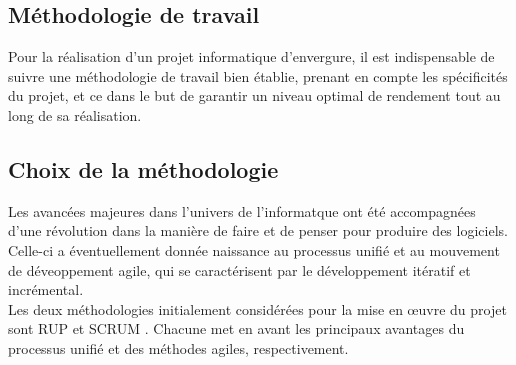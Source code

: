 \begin{spacing}{1.5}
\section{Méthodologie de travail}
Pour la réalisation d'un projet informatique d'envergure, il est indispensable de suivre une méthodologie de travail bien établie, prenant en compte les spécificités du projet, et ce dans le but de garantir un niveau optimal de rendement tout au long de sa réalisation.

\subsection{Choix de la méthodologie}
Les avancées majeures dans l'univers de l'informatque ont été accompagnées d'une révolution dans la manière de faire et de penser pour produire des logiciels. Celle-ci a éventuellement donnée naissance au processus unifié et au mouvement de déveoppement agile, qui se caractérisent par le développement itératif et incrémental.\\
Les deux méthodologies initialement considérées pour la mise en œuvre du projet sont RUP \cite{RUP} et SCRUM \cite{SCRUM}. Chacune met en avant les principaux avantages du processus unifié et des méthodes agiles, respectivement.\\


\end{spacing}
